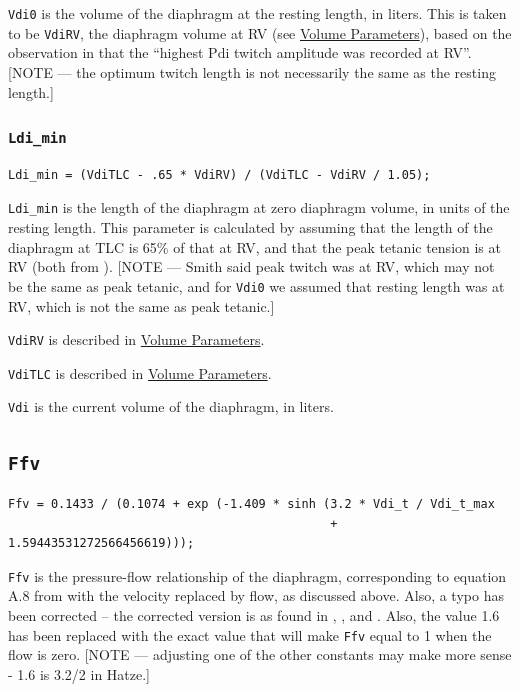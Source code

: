 \documentclass[12pt,openany,oneside]{book}
\newcommand{\inquotes}[1]{{{``#1''}}}
\begin{document}
\verb~Vdi0~ is the volume of the diaphragm at the resting length, in
liters. This is taken to be \verb~VdiRV~, the diaphragm volume at RV
(see \hyperref[Volume Parameters]{Volume Parameters}), based on the
observation in \citet{Smith01051987} that the \inquotes{highest Pdi twitch
amplitude was recorded at RV}. [NOTE --- the optimum twitch length is
not necessarily the same as the resting length.]

\subsubsection{\texttt{Ldi\_min}}
\begin{verbatim}
Ldi_min = (VdiTLC - .65 * VdiRV) / (VdiTLC - VdiRV / 1.05); 
\end{verbatim}

\verb~Ldi_min~ is the length of the diaphragm at zero diaphragm
volume, in units of the resting length. This parameter is calculated
by assuming that the length of the diaphragm at TLC is 65\% of that at
RV, and that the peak tetanic tension is at RV (both from
\citet{Smith01051987}). [NOTE --- Smith said peak twitch was at RV,
which may not be the same as peak tetanic, and for \verb~Vdi0~ we
assumed that resting length was at RV, which is not the same as peak
tetanic.]

\verb~VdiRV~ is described in \hyperref[Volume Parameters]{Volume
  Parameters}.

\verb~VdiTLC~ is described in \hyperref[Volume Parameters]{Volume
  Parameters}.

\verb~Vdi~ is the current volume of the diaphragm, in liters.

\subsection{\texttt{Ffv}}
\begin{verbatim}
Ffv = 0.1433 / (0.1074 + exp (-1.409 * sinh (3.2 * Vdi_t / Vdi_t_max
                                             + 1.59443531272566456619)));
\end{verbatim}
\verb~Ffv~ is the pressure-flow relationship of the diaphragm,
corresponding to equation A.8 from \citet{Ratnovsky20031771} with the
velocity replaced by flow, as discussed above. Also, a typo has been
corrected -- the corrected version is as found in \citet{1545509},
\citet{Rosen1999415}, and \citet{Hatze1981}. Also, the value 1.6 has
been replaced with the exact value that will make \verb~Ffv~ equal to
1 when the flow is zero. [NOTE --- adjusting one of the other constants
may make more sense - 1.6 is 3.2/2 in Hatze.]
\end{document}
